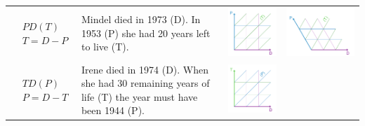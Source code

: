 \documentclass[12pt,oneside,a4paper]{article} %
\begin{document}
\begin{longtable}{m{}m{}m{}m{}}
  $$\begin{aligned}
    &PD(T) \\
    &T = D - P
  \end{aligned}$$ &
  Mindel died in 1973 (D). In 1953 (P) she had 20 years left to live (T). &
  \includegraphics[scale=.5]{Figures/DiagramTable/PD_rt.pdf} &
  \includegraphics[scale=.5]{Figures/DiagramTable/PD_iso.pdf}  \\
  $$\begin{aligned}
    &TD(P) \\
    &P = D - T
  \end{aligned}$$ &
  Irene died in 1974 (D). When she had 30 remaining years of life (T) the year must have been 1944 (P). &
  \includegraphics[scale=.5]{Figures/DiagramTable/TD_rt.pdf} &

\end{longtable}
\end{document}
